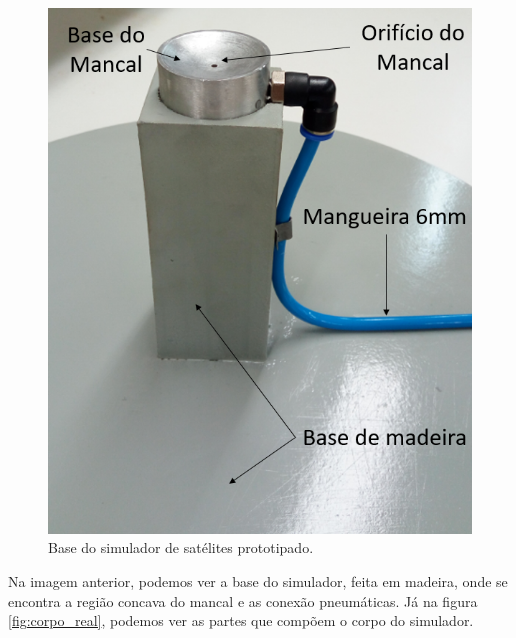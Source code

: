 \begin{figure}[H]
  \caption{Base do simulador de satélites prototipado.}
  \begin{center}
      \includegraphics[scale=.5]{metodologia/img/base_real}
  \end{center}
  \label{fig:base_real}
\end{figure}

Na imagem anterior, podemos ver a base do simulador, feita em madeira, onde se encontra a região concava do mancal e as conexão 
pneumáticas. Já na figura \ref{fig:corpo_real}, podemos ver as partes que compõem o corpo do simulador.

